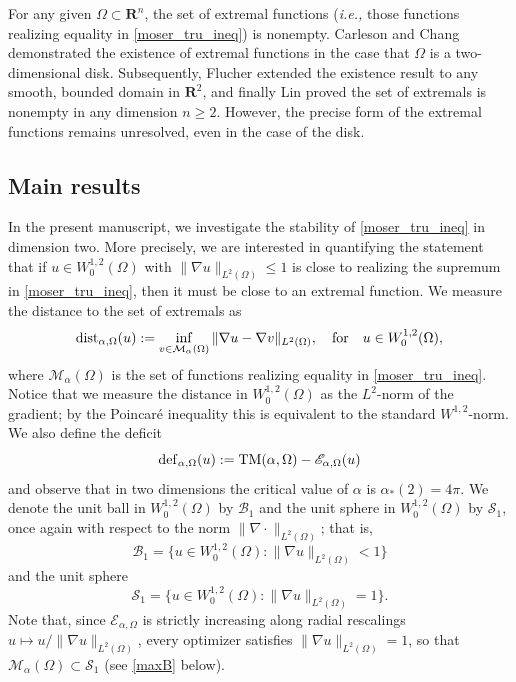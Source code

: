 \documentclass[reqno,11pt]{amsart}
\theoremstyle{definition}
\newcommand{\R}{\mathbf{R}}
\begin{document}
For any given $\Omega \subset \R^n$, 
the set of extremal functions ({\it i.e.,} those functions realizing equality 
in \eqref{moser_tru_ineq}) is nonempty. Carleson and Chang \cite{Carleson-Chang}
demonstrated the existence of extremal functions in the case that $\Omega$ 
is a two-dimensional disk. Subsequently, Flucher \cite{Flucher1992} extended 
the existence result to any smooth, bounded domain in $\R^2$, and finally 
Lin \cite{Lin1996} proved the set of extremals is nonempty in 
any dimension $n \geq 2$. However, the precise form of the extremal 
functions remains unresolved, even in the case of the disk.

\subsection{Main results} In the present manuscript, we investigate the 
stability of \eqref{moser_tru_ineq}
in dimension two. More precisely, we are interested in quantifying the statement 
that if $u \in W^{1,2}_0(\Omega)$ with $\| \nabla u \|_{L^2(\Omega)} \leq 1$ 
is close to realizing the supremum in \eqref{moser_tru_ineq}, then it 
must be close to an extremal function. We measure the distance to the set of 
extremals as 
\begin{equation} \label{dist_defn} 
{\rm dist}_{\alpha,\Omega}(u):=\inf_{v\in\mathcal{M}_\alpha(\Omega)}
\|\nabla u-\nabla v\|_{L^2(\Omega)}, \quad {\rm for} \quad u\in W^{1,2}_0(\Omega),
\end{equation} 
where $\mathcal{M}_\alpha(\Omega)$ is the set of functions realizing equality 
in \eqref{moser_tru_ineq}. Notice that we measure the distance in $W^{1,2}_0(\Omega)$ 
as the $L^2$-norm of the gradient; by the Poincar\'e inequality this is equivalent 
to the standard $W^{1,2}$-norm. We also define the deficit 
\begin{equation}\label{deficit_defn} 
{\rm def}_{\alpha,\Omega}(u):={\rm TM}(\alpha,\Omega)-\mathscr{E}_{\alpha,\Omega}(u) 
\end{equation} 
and observe that in two dimensions the critical value of $\alpha$ 
is $\alpha_*(2) = 4\pi$. We denote the unit ball in $W^{1,2}_0(\Omega)$ 
by $\mathcal{B}_1$ and the unit sphere in $W^{1,2}_0(\Omega)$ by $\mathcal{S}_1$, 
once again with respect to the norm $\| \nabla \cdot \|_{L^2(\Omega)}$; that is,
\[
\mathcal{B}_1 = \{ u \in W^{1,2}_0(\Omega): \| \nabla u \|_{L^2(\Omega)}  < 1 \}
\]
and the unit sphere
\[
\mathcal{S}_1 = \{ u \in W^{1,2}_0(\Omega) : \| \nabla u \|_{L^2(\Omega)} = 1\}.
\]
Note that, since $\mathscr{E}_{\alpha,\Omega}$ is strictly increasing along radial 
rescalings $u\mapsto u/\|\nabla u\|_{L^2(\Omega)}$, every optimizer satisfies 
$\|\nabla u\|_{L^2(\Omega)}=1$, so that $\mathcal{M}_\alpha(\Omega)\subset\mathcal{S}_1$ 
(see \eqref{maxB} below).
\end{document}
